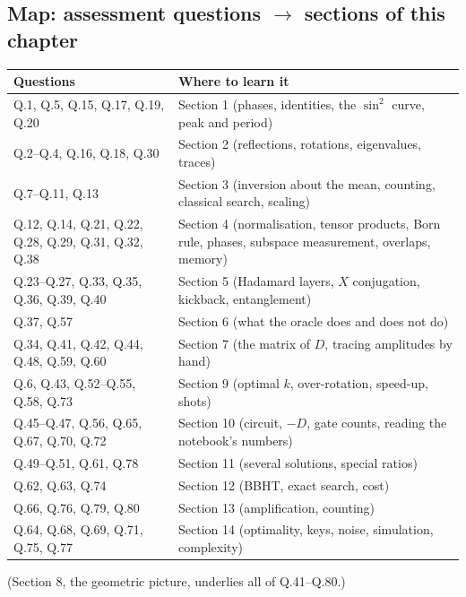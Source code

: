 \documentclass[11pt,a4paper,openany]{book}
\begin{document}
\subsection{Map: assessment questions $\to$ sections of this chapter}
\begin{tabularx}{\linewidth}{@{}lX@{}}
\toprule
\textbf{Questions} & \textbf{Where to learn it}\\ \midrule
Q.1, Q.5, Q.15, Q.17, Q.19, Q.20 & Section 1 (phases, identities, the $\sin^2$ curve, peak and period)\\
Q.2--Q.4, Q.16, Q.18, Q.30 & Section 2 (reflections, rotations, eigenvalues, traces)\\
Q.7--Q.11, Q.13 & Section 3 (inversion about the mean, counting, classical search, scaling)\\
Q.12, Q.14, Q.21, Q.22, Q.28, Q.29, Q.31, Q.32, Q.38 & Section 4 (normalisation, tensor products, Born rule, phases, subspace measurement, overlaps, memory)\\
Q.23--Q.27, Q.33, Q.35, Q.36, Q.39, Q.40 & Section 5 (Hadamard layers, $X$ conjugation, kickback, entanglement)\\
Q.37, Q.57 & Section 6 (what the oracle does and does not do)\\
Q.34, Q.41, Q.42, Q.44, Q.48, Q.59, Q.60 & Section 7 (the matrix of $D$, tracing amplitudes by hand)\\
Q.6, Q.43, Q.52--Q.55, Q.58, Q.73 & Section 9 (optimal $k$, over-rotation, speed-up, shots)\\
Q.45--Q.47, Q.56, Q.65, Q.67, Q.70, Q.72 & Section 10 (circuit, $-D$, gate counts, reading the notebook's numbers)\\
Q.49--Q.51, Q.61, Q.78 & Section 11 (several solutions, special ratios)\\
Q.62, Q.63, Q.74 & Section 12 (BBHT, exact search, cost)\\
Q.66, Q.76, Q.79, Q.80 & Section 13 (amplification, counting)\\
Q.64, Q.68, Q.69, Q.71, Q.75, Q.77 & Section 14 (optimality, keys, noise, simulation, complexity)\\
\bottomrule
\end{tabularx}
{\small (Section 8, the geometric picture, underlies all of Q.41--Q.80.)}

\end{document}
